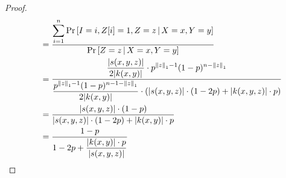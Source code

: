 \begin{proof}
\begin{align*}
& \quad = \frac{\displaystyle \sum_{i=1}^n \Pr \left[ I = i, Z[i] = 1, Z = z \, \middle| \, X = x, Y = y \right]}{\displaystyle \Pr \left[ Z = z \, \middle| \, X = x, Y = y \right]} \\
& \quad = \frac{\displaystyle \frac{|s(x,y,z)|}{2|k(x,y)|} \cdot p^{\left\| z \right\|_1 - 1} (1 - p)^{n - \left\| z \right\|_1}}{\displaystyle \frac{p^{\left\| z \right\|_1 - 1} (1 - p)^{n - 1 - \left\| z \right\|_1}}{2|k(x,y)|} \cdot \left( |s(x,y,z)| \cdot (1 - 2p) + |k(x,y,z)| \cdot p \right) } \\
& \quad = \frac{\displaystyle |s(x,y,z)| \cdot (1 - p)}{\displaystyle |s(x,y,z)| \cdot (1 - 2p) + |k(x,y)| \cdot p } \\
& \quad = \frac{\displaystyle 1 - p}{\displaystyle 1 - 2p + \frac{|k(x,y)| \cdot p}{|s(x,y,z)|}} \\
\end{align*}


\end{proof}
